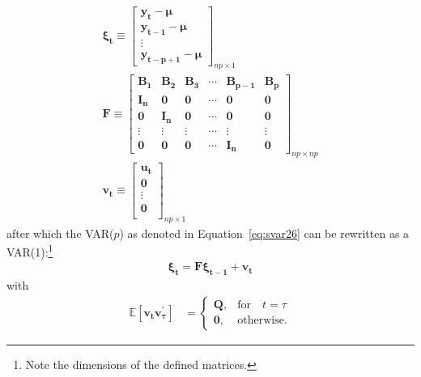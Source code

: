 \documentclass[a4paper,11pt,listof=nochaptergap,oneside,pointednumbers,bibtotoc,bigheadings,liststotoc]{scrbook}
\theoremstyle{mysatz}
\theoremstyle{mydefinition}
\theoremstyle{mybemerkung}
\newcommand{\vect}[1]{\boldsymbol{\mathbf{#1}}}
\begin{document}
\begin{itemize}
\begin{enumerate}
	\begin{equation} \label{eq:svar27}
	\begin{split}
		\vect{\xi_t}	 \equiv \begin{bmatrix}
    						\vect{y_t}-\vect{\mu}\\
						\vect{y_{t-1}}-\vect{\mu} \\
						\vdots \\
						\vect{y_{t-p+1}}-\vect{\mu}
 						\end{bmatrix}_{np \times 1} \\
		\vect{F} \equiv \begin{bmatrix}
    						\vect{B_1} & \vect{B_2} & \vect{B_3} & \cdots & \vect{B_{p-1}} & \vect{B_p}\\
						\vect{I_n} & \vect{0} & \vect{0} & \cdots & \vect{0} & \vect{0}\\
						\vect{0} & \vect{I_n} & \vect{0} & \cdots & \vect{0} & \vect{0}\\
						\vdots & \vdots & \vdots & \cdots & \vdots & \vdots\\
						\vect{0} & \vect{0} & \vect{0} & \cdots & \vect{I_n} & \vect{0}
 						\end{bmatrix}_{np \times np}\\
		\vect{v_t} \equiv \begin{bmatrix}
    						\vect{u_t} \\
						\vect{0} \\
						\vdots \\
						\vect{0} \\
 						\end{bmatrix}_{np \times 1}
	\end{split}								
	\end{equation}	
	after which the VAR($p$) as denoted in Equation~\ref{eq:svar26} can be rewritten as a VAR(1):\footnote{Note the dimensions of the defined matrices.}
	\begin{equation} \label{eq:svar28}
	\begin{split}
		\vect{\xi_t} = \vect{F}\vect{\xi_{t-1}} + \vect{v_t}
	\end{split}								
	\end{equation}	
	with
	\begin{equation} \label{eq:svar29}
	\begin{split}
		\mathbb{E}[\vect{v_t}\vect{v_{\tau}^'}] & =     \begin{cases}
      												\vect{Q}, & \text{for} \quad t = \tau \\
      												\vect{0}, & \text{otherwise.}

\end{cases}
\end{split}
\end{equation}
\end{enumerate}
\end{itemize}
\end{document}
